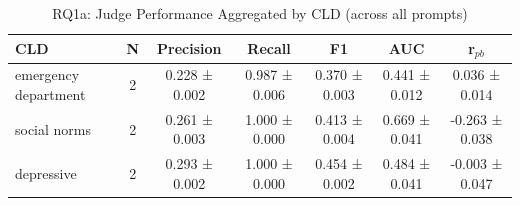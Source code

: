 \begin{table}[htbp]
\centering
\caption{RQ1a: Judge Performance Aggregated by CLD (across all prompts)}
\label{tab:rq1a_by_cld}
\begin{tabular}{lcccccc}
\toprule
\textbf{CLD} & \textbf{N} & \textbf{Precision} & \textbf{Recall} & \textbf{F1} & \textbf{AUC} & \textbf{r$_{pb}$} \\
\midrule
emergency department & 2 & 0.228 ± 0.002 & 0.987 ± 0.006 & 0.370 ± 0.003 & 0.441 ± 0.012 & 0.036 ± 0.014 \\
social norms & 2 & 0.261 ± 0.003 & 1.000 ± 0.000 & 0.413 ± 0.004 & 0.669 ± 0.041 & -0.263 ± 0.038 \\
depressive & 2 & 0.293 ± 0.002 & 1.000 ± 0.000 & 0.454 ± 0.002 & 0.484 ± 0.041 & -0.003 ± 0.047 \\
\bottomrule
\end{tabular}
\end{table}